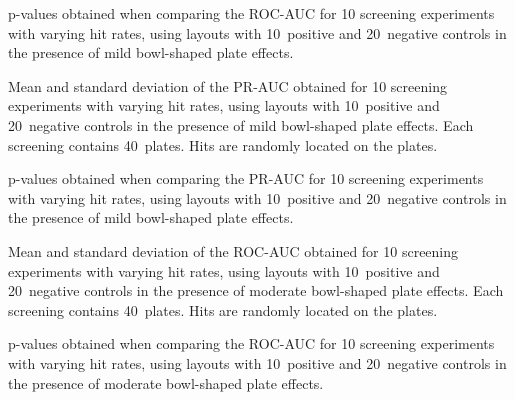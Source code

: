 \begin{table}[p]
    \centering
    \small
    
    \caption{p-values obtained when comparing the ROC-AUC for 10 screening experiments with varying hit rates, using layouts with 10~positive and 20~negative controls in the presence of mild bowl-shaped plate effects.}
    \label{tab:screening-roc_pvalues-20-10-0.06}
\end{table}

\begin{table}[p]
    \centering
    \small
    
    \caption{Mean and standard deviation of the PR-AUC obtained for 10 screening experiments with varying hit rates, using layouts with 10~positive and 20~negative controls in the presence of mild bowl-shaped plate effects. Each screening contains 40~plates. Hits are randomly located on the plates.}
    \label{tab:screening-pr_20-10-0.06}
\end{table}

\begin{table}[p]
    \centering
    \small
    
    \caption{p-values obtained when comparing the PR-AUC for 10 screening experiments with varying hit rates, using layouts with 10~positive and 20~negative controls in the presence of mild bowl-shaped plate effects.}
    \label{tab:screening-pr_pvalues-20-10-0.06}
\end{table}

\begin{table}[p]
    \centering
    \small
    
    \caption{Mean and standard deviation of the ROC-AUC obtained for 10 screening experiments with varying hit rates, using layouts with 10~positive and 20~negative controls in the presence of moderate bowl-shaped plate effects. Each screening contains 40~plates. Hits are randomly located on the plates.}
    \label{tab:screening-roc_20-10-0.1}
\end{table}

\begin{table}[p]
    \centering
    \small
    
    \caption{p-values obtained when comparing the ROC-AUC for 10 screening experiments with varying hit rates, using layouts with 10~positive and 20~negative controls in the presence of moderate bowl-shaped plate effects.}
    \label{tab:screening-roc_pvalues-20-10-0.1}
\end{table}

